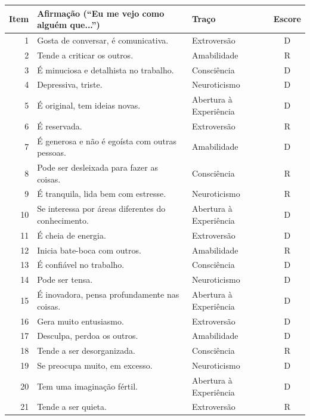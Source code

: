 \begin{quadro}[htbp]
    \caption{Itens do BFI-44}
    \label{quadro:bfi44-itens}
    \centering
    \footnotesize
    \begin{tabular}{rp{7.6cm}lc}
        \toprule
        Item & Afirmação (``Eu me vejo como alguém que...'') & Traço & Escore \\
        \midrule
        1 & Gosta de conversar, é comunicativa. & Extroversão & D \\
        2 & Tende a criticar os outros. & Amabilidade & R \\
        3 & É minuciosa e detalhista no trabalho. & Consciência & D \\
        4 & Depressiva, triste. & Neuroticismo & D \\
        5 & É original, tem ideias novas. & Abertura à Experiência & D \\
        6 & É reservada. & Extroversão & R \\
        7 & É generosa e não é egoísta com outras pessoas. & Amabilidade & D \\
        8 & Pode ser desleixada para fazer as coisas. & Consciência & R \\
        9 & É tranquila, lida bem com estresse. & Neuroticismo & R \\
        10 & Se interessa por áreas diferentes do conhecimento. & Abertura à Experiência & D \\
        11 & É cheia de energia. & Extroversão & D \\
        12 & Inicia bate-boca com outros. & Amabilidade & R \\
        13 & É confiável no trabalho. & Consciência & D \\
        14 & Pode ser tensa. & Neuroticismo & D \\
        15 & É inovadora, pensa profundamente nas coisas. & Abertura à Experiência & D \\
        16 & Gera muito entusiasmo. & Extroversão & D \\
        17 & Desculpa, perdoa os outros. & Amabilidade & D \\
        18 & Tende a ser desorganizada. & Consciência & R \\
        19 & Se preocupa muito, em excesso. & Neuroticismo & D \\
        20 & Tem uma imaginação fértil. & Abertura à Experiência & D \\
        21 & Tende a ser quieta. & Extroversão & R \\

\end{tabular}
\end{quadro}
